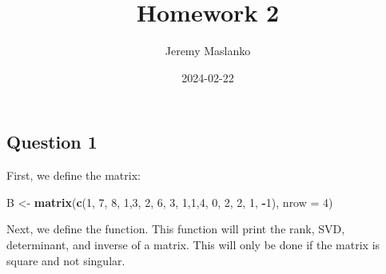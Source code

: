 \documentclass[
]{article}
\title{Homework 2}
\author{Jeremy Maslanko}
\date{2024-02-22}
\newenvironment{Shaded}{\begin{snugshade}}{\end{snugshade}}
\newcommand{\AttributeTok}[1]{\textcolor[rgb]{0.13,0.29,0.53}{#1}}
\newcommand{\DecValTok}[1]{\textcolor[rgb]{0.00,0.00,0.81}{#1}}
\newcommand{\FunctionTok}[1]{\textcolor[rgb]{0.13,0.29,0.53}{\textbf{#1}}}
\newcommand{\NormalTok}[1]{#1}
\newcommand{\OtherTok}[1]{\textcolor[rgb]{0.56,0.35,0.01}{#1}}
\newcommand{\SpecialCharTok}[1]{\textcolor[rgb]{0.81,0.36,0.00}{\textbf{#1}}}
\begin{document}
\maketitle

\hypertarget{question-1}{%
\subsection{Question 1}\label{question-1}}

First, we define the matrix:

\begin{Shaded}
\begin{Highlighting}[]
\NormalTok{B }\OtherTok{\textless{}{-}} \FunctionTok{matrix}\NormalTok{(}\FunctionTok{c}\NormalTok{(}\DecValTok{1}\NormalTok{, }\DecValTok{7}\NormalTok{, }\DecValTok{8}\NormalTok{, }\DecValTok{1}\NormalTok{,}\DecValTok{3}\NormalTok{, }\DecValTok{2}\NormalTok{, }\DecValTok{6}\NormalTok{, }\DecValTok{3}\NormalTok{, }\DecValTok{1}\NormalTok{,}\DecValTok{1}\NormalTok{,}\DecValTok{4}\NormalTok{, }\DecValTok{0}\NormalTok{, }\DecValTok{2}\NormalTok{, }\DecValTok{2}\NormalTok{, }\DecValTok{1}\NormalTok{, }\SpecialCharTok{{-}}\DecValTok{1}\NormalTok{), }\AttributeTok{nrow =} \DecValTok{4}\NormalTok{)}
\end{Highlighting}
\end{Shaded}

Next, we define the function. This function will print the rank, SVD,
determinant, and inverse of a matrix. This will only be done if the
matrix is square and not singular.
\end{document}
